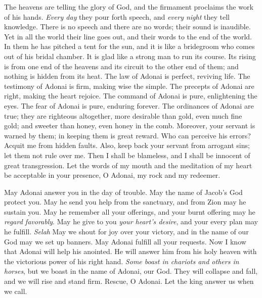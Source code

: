 \begin{biblechapter} %
 The heavens are telling the glory of God, 
and the firmament proclaims the work of his hands.
\verse \textit{Every day} they pour forth speech, 
and \textit{every night} they tell knowledge.
\verse There is no speech and there are no words; 
their sound is inaudible.
\verse Yet in all the world their line goes out, 
and their words to the end of the world. 
In them he has pitched a tent for the sun,
\verse and it is like a bridegroom 
who comes out of his bridal chamber. 
It is glad like a strong man 
to run its course.
\verse Its rising is from one end of the heavens 
and its circuit to the other end of them; 
and nothing is hidden from its heat.
\verse The law of Adonai is perfect, reviving life. 
The testimony of Adonai is firm, making wise the simple.
\verse The precepts of Adonai are right, making the heart rejoice. 
The command of Adonai is pure, enlightening the eyes.
\verse The fear of Adonai is pure, enduring forever. 
The ordinances of Adonai are true; they are righteous altogether,
\verse more desirable than gold, even much fine gold; 
and sweeter than honey, even honey in the comb.
\verse Moreover, your servant is warned by them; 
in keeping them is great reward.
\verse Who can perceive his errors? 
Acquit me from hidden faults.
\verse Also, keep back your servant from arrogant sins; 
let them not rule over me. 
Then I shall be blameless, 
and I shall be innocent of great transgression.
\verse Let the words of my mouth and the meditation of my heart 
be acceptable in your presence, 
O Adonai, my rock and my redeemer.
\end{biblechapter}

\begin{biblechapter} %
 May Adonai answer you in the day of trouble. 
May the name of Jacob’s God protect you.
\verse May he send you help from the sanctuary, 
and from Zion may he sustain you.
\verse May he remember all your offerings, 
and your burnt offering may he \textit{regard favorably}.
\verse May he give to you \textit{your heart’s desire}, 
and your every plan may he fulfill. \textit{Selah}
\verse May we shout for joy over your victory, 
and in the name of our God may we set up banners. 
May Adonai fulfill all your requests.
\verse Now I know that Adonai will help his anointed. 
He will answer him from his holy heaven 
with the victorious power of his right hand.
\verse \textit{Some boast in chariots and others in horses}, 
but we boast in the name of Adonai, our God.
\verse They will collapse and fall, 
and we will rise and stand firm.
\verse Rescue, O Adonai. 
Let the king answer us when we call.
\end{biblechapter}

